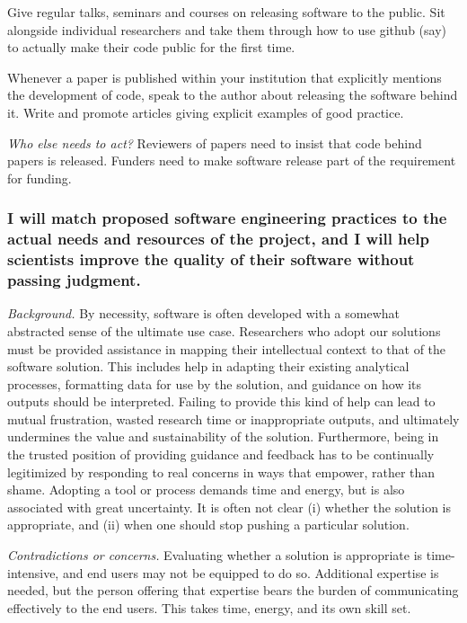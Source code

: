 \documentclass[a4paper,UKenglish]{dagman}
\renewcommand{\paragraph}[1]{\subsubsection*{#1}\xspace}
\begin{document}
Give regular talks, seminars and courses on releasing software to the public. 
Sit alongside individual researchers and take them through how to use github (say) to actually make their code public for the first time.

Whenever a paper is published within your institution that explicitly mentions the development of code, speak to the author about releasing the software behind it. Write and promote articles giving explicit examples of good practice.



\emph{Who else needs to act?}
Reviewers of papers need to insist that code behind papers is released. Funders need to make software release part of the requirement for funding.

\paragraph{I will match proposed software engineering practices to the actual needs and resources of the project, and I will help scientists improve the quality of their software without passing judgment.}


\emph{Background.}
By necessity, software is often developed with a somewhat abstracted sense of the ultimate use case. Researchers who adopt our solutions must be provided assistance in mapping their intellectual context to that of the software solution. This includes help in adapting their existing analytical processes, formatting data for use by the solution, and guidance on how its outputs should be interpreted. Failing to provide this kind of help can lead to mutual frustration, wasted research time or inappropriate outputs, and ultimately undermines the value and sustainability of the solution. Furthermore, being in the trusted position of providing guidance and feedback has to be continually legitimized by responding to real concerns in ways that empower, rather than shame. Adopting a tool or process demands time and energy, but is also associated with great uncertainty. It is often not clear (i) whether the solution is appropriate, and (ii) when one should stop pushing a particular solution.

\emph{Contradictions or concerns.}
Evaluating whether a solution is appropriate is time-intensive, and end users may not be equipped to do so. Additional expertise is needed, but the person offering that expertise bears the burden of communicating effectively to the end users. This takes time, energy, and its own skill set.
\end{document}
